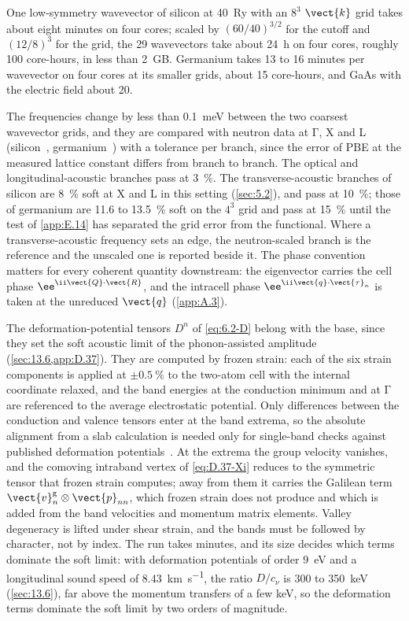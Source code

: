 One low-symmetry wavevector of silicon at \SI{40}{Ry} with an $8^3$ $\vect{k}$ grid takes about eight minutes on four cores; scaled by $(60/40)^{3/2}$ for the cutoff and $(12/8)^3$ for the grid, the 29 wavevectors take about \SI{24}{h} on four cores, roughly 100 core-hours, in less than \SI{2}{GB}. Germanium takes 13 to 16 minutes per wavevector on four cores at its smaller grids, about 15 core-hours, and GaAs with the electric field about 20.

The frequencies change by less than \SI{0.1}{meV} between the two coarsest wavevector grids, and they are compared with neutron data at $\mathrm{\Gamma}$, X and L (silicon~\cite{nilsson1972study}, germanium~\cite{nilsson1971phonon}) with a tolerance per branch, since the error of PBE at the measured lattice constant differs from branch to branch. The optical and longitudinal-acoustic branches pass at \SI{3}{\percent}. The transverse-acoustic branches of silicon are \SI{8}{\percent} soft at X and L in this setting (\cref{sec:5.2}), and pass at \SI{10}{\percent}; those of germanium are 11.6 to \SI{13.5}{\percent} soft on the $4^3$ grid and pass at \SI{15}{\percent} until the test of \cref{app:E.14} has separated the grid error from the functional. Where a transverse-acoustic frequency sets an edge, the neutron-scaled branch is the reference and the unscaled one is reported beside it. The phase convention matters for every coherent quantity downstream: the eigenvector carries the cell phase $\ee^{\ii\vect{Q}\cdot\vect{R}}$, and the intracell phase $\ee^{\ii\vect{q}\cdot\vect{\tau}_\kappa}$ is taken at the unreduced $\vect{q}$ (\cref{app:A.3}).

The deformation-potential tensors $D^n$ of \cref{eq:6.2-D} belong with the base, since they set the soft acoustic limit of the phonon-assisted amplitude (\cref{sec:13.6,app:D.37}). They are computed by frozen strain: each of the six strain components is applied at $\pm\SI{0.5}{\percent}$ to the two-atom cell with the internal coordinate relaxed, and the band energies at the conduction minimum and at $\mathrm{\Gamma}$ are referenced to the average electrostatic potential. Only differences between the conduction and valence tensors enter at the band extrema, so the absolute alignment from a slab calculation is needed only for single-band checks against published deformation potentials~\cite{li2021deformation}. At the extrema the group velocity vanishes, and the comoving intraband vertex of \cref{eq:D.37-Xi} reduces to the symmetric tensor that frozen strain computes; away from them it carries the Galilean term $\vect{v}^{\mathrm{g}}_n\otimes\vect{p}_{nn}$, which frozen strain does not produce and which is added from the band velocities and momentum matrix elements. Valley degeneracy is lifted under shear strain, and the bands must be followed by character, not by index. The run takes minutes, and its size decides which terms dominate the soft limit: with deformation potentials of order \SI{9}{eV} and a longitudinal sound speed of \SI{8.43}{km.s^{-1}}, the ratio $D/c_\nu$ is 300 to \SI{350}{keV} (\cref{sec:13.6}), far above the momentum transfers of a few keV, so the deformation terms dominate the soft limit by two orders of magnitude.

